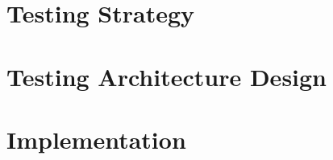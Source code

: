 

\section{Testing Strategy}
	
	\label{sec:4-strategy}
	
\section{Testing Architecture Design}
	
	\label{sec:4-architecture}
	
\section{Implementation}
	
	\label{sec:4-implementation}